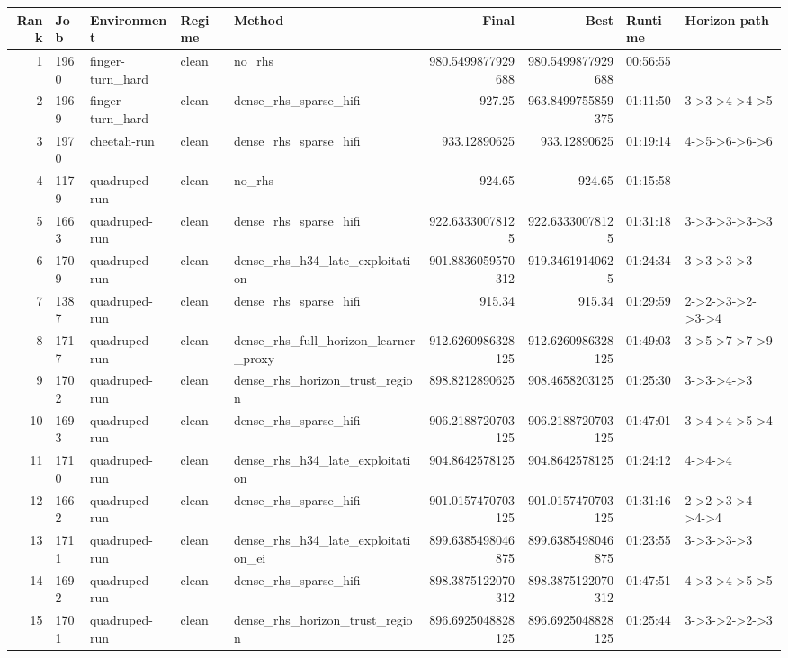 \begin{tabular}{rllllrrll}
\toprule
Rank & Job & Environment & Regime & Method & Final & Best & Runtime & Horizon path \\
\midrule
1 & 1960 & finger-turn\_hard & clean & no\_rhs & 980.5499877929688 & 980.5499877929688 & 00:56:55 &  \\
2 & 1969 & finger-turn\_hard & clean & dense\_rhs\_sparse\_hifi & 927.25 & 963.8499755859375 & 01:11:50 & 3->3->4->4->5 \\
3 & 1970 & cheetah-run & clean & dense\_rhs\_sparse\_hifi & 933.12890625 & 933.12890625 & 01:19:14 & 4->5->6->6->6 \\
4 & 1179 & quadruped-run & clean & no\_rhs & 924.65 & 924.65 & 01:15:58 &  \\
5 & 1663 & quadruped-run & clean & dense\_rhs\_sparse\_hifi & 922.63330078125 & 922.63330078125 & 01:31:18 & 3->3->3->3->3 \\
6 & 1709 & quadruped-run & clean & dense\_rhs\_h34\_late\_exploitation & 901.8836059570312 & 919.34619140625 & 01:24:34 & 3->3->3->3 \\
7 & 1387 & quadruped-run & clean & dense\_rhs\_sparse\_hifi & 915.34 & 915.34 & 01:29:59 & 2->2->3->2->3->4 \\
8 & 1717 & quadruped-run & clean & dense\_rhs\_full\_horizon\_learner\_proxy & 912.6260986328125 & 912.6260986328125 & 01:49:03 & 3->5->7->7->9 \\
9 & 1702 & quadruped-run & clean & dense\_rhs\_horizon\_trust\_region & 898.8212890625 & 908.4658203125 & 01:25:30 & 3->3->4->3 \\
10 & 1693 & quadruped-run & clean & dense\_rhs\_sparse\_hifi & 906.2188720703125 & 906.2188720703125 & 01:47:01 & 3->4->4->5->4 \\
11 & 1710 & quadruped-run & clean & dense\_rhs\_h34\_late\_exploitation & 904.8642578125 & 904.8642578125 & 01:24:12 & 4->4->4 \\
12 & 1662 & quadruped-run & clean & dense\_rhs\_sparse\_hifi & 901.0157470703125 & 901.0157470703125 & 01:31:16 & 2->2->3->4->4->4 \\
13 & 1711 & quadruped-run & clean & dense\_rhs\_h34\_late\_exploitation\_ei & 899.6385498046875 & 899.6385498046875 & 01:23:55 & 3->3->3->3 \\
14 & 1692 & quadruped-run & clean & dense\_rhs\_sparse\_hifi & 898.3875122070312 & 898.3875122070312 & 01:47:51 & 4->3->4->5->5 \\
15 & 1701 & quadruped-run & clean & dense\_rhs\_horizon\_trust\_region & 896.6925048828125 & 896.6925048828125 & 01:25:44 & 3->3->2->2->3 \\

\end{tabular}
